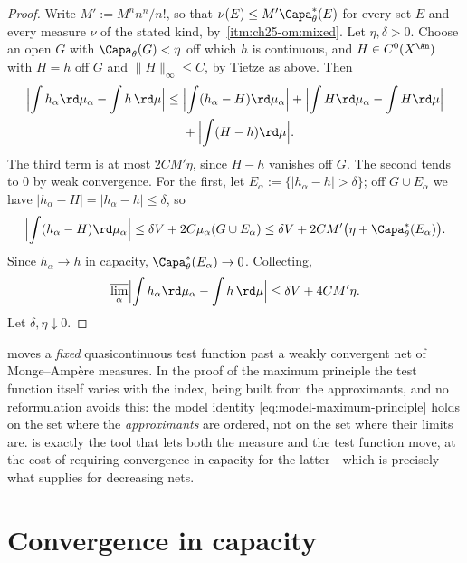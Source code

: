 \begin{proof}
Write $M':=M^nn^n/n!$, so that $\nu(E)\leq M'\Capa^*_\theta(E)$ for every
set $E$ and every measure $\nu$ of the stated kind, by
\,\cref{itm:ch25-om:mixed}.  Let
$\eta,\delta>0$.  Choose an open $G$ with $\Capa_\theta(G)<\eta$ off
which $h$ is continuous, and $H\in C^0(X^{\An})$ with $H=h$ off $G$
and $\|H\|_\infty\leq C$, by Tietze as above.  Then
\[
\begin{split}
 \Bigl|\int h_\alpha\rd\mu_\alpha-\int h\,\rd\mu\Bigr|
 \leq{}&\Bigl|\int(h_\alpha-H)\rd\mu_\alpha\Bigr|
       +\Bigl|\int H\rd\mu_\alpha-\int H\rd\mu\Bigr|\\
      &+\Bigl|\int(H-h)\rd\mu\Bigr| .
\end{split}
\]
The third term is at most $2CM'\eta$, since $H-h$ vanishes off $G$.
The second tends to $0$ by weak convergence.  For the first, let
$E_\alpha:=\{|h_\alpha-h|>\delta\}$; off $G\cup E_\alpha$ we have
$|h_\alpha-H|=|h_\alpha-h|\leq\delta$, so
\[
 \Bigl|\int(h_\alpha-H)\rd\mu_\alpha\Bigr|
 \leq\delta V+2C\mu_\alpha(G\cup E_\alpha)
 \leq\delta V+2CM'\bigl(\eta+\Capa^*_\theta(E_\alpha)\bigr).
\]
Since $h_\alpha\to h$ in capacity, $\Capa^*_\theta(E_\alpha)\to0$.
Collecting,
\[
 \varlimsup_\alpha\Bigl|\int h_\alpha\rd\mu_\alpha-\int h\,\rd\mu\Bigr|
 \leq\delta V+4CM'\eta .
\]
Let $\delta,\eta\downarrow0$.
\end{proof}

\begin{remark}
\label{rem:ch25-why-joint}
 moves a \emph{fixed} quasicontinuous test
function past a weakly convergent net of Monge--Amp\`ere measures.  In the
proof of the maximum principle the test function itself varies with the
index, being built from the approximants, and no reformulation avoids this:
the model identity \eqref{eq:model-maximum-principle} holds on the set where
the \emph{approximants} are ordered, not on the set where their limits are.
 is exactly the tool that lets both the measure
and the test function move, at the cost of requiring convergence in capacity
for the latter---which is precisely what
 supplies for decreasing nets.
\end{remark}

\section{Convergence in capacity}
\label{sec:ch25-convergence}

